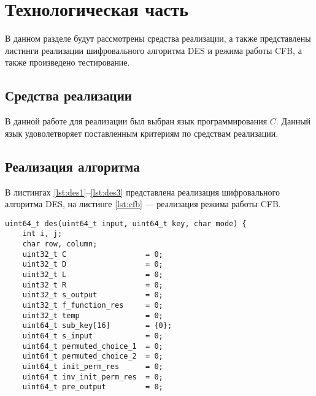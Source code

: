 \chapter{Технологическая часть}

В данном разделе будут рассмотрены средства реализации, а также представлены листинги реализации шифровального алгоритма DES и режима работы CFB, а также произведено тестирование.

\section{Средства реализации}
В данной работе для реализации был выбран язык программирования $C$. Данный язык удоволетворяет поставленным критериям по средствам реализации.

\section{Реализация алгоритма}

В листингах \ref{lst:des1}--\ref{lst:des3} представлена реализация шифровального алгоритма DES, на листинге \ref{lst:cfb} --- реализация режима работы CFB.

\begin{center}
    \captionsetup{justification=raggedright,singlelinecheck=off}
    \begin{lstlisting}[label=lst:des1,caption=Реализация шифровального  алгоритма DES часть 1]
uint64_t des(uint64_t input, uint64_t key, char mode) {
    int i, j;
    char row, column;
    uint32_t C                  = 0;
    uint32_t D                  = 0;
    uint32_t L                  = 0;
    uint32_t R                  = 0;
    uint32_t s_output           = 0;
    uint32_t f_function_res     = 0;
    uint32_t temp               = 0;
    uint64_t sub_key[16]        = {0};
    uint64_t s_input            = 0;
    uint64_t permuted_choice_1  = 0;
    uint64_t permuted_choice_2  = 0;
    uint64_t init_perm_res      = 0;
    uint64_t inv_init_perm_res  = 0;
    uint64_t pre_output         = 0;
\end{lstlisting}
\end{center}


